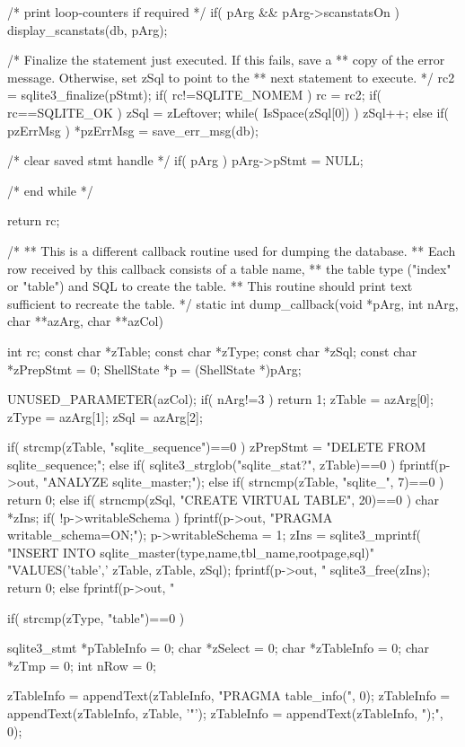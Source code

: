 \begin{Codex}[label=shell.c,numbers=left]
{{{{      /* print loop-counters if required */
      if( pArg && pArg->scanstatsOn ){
        display_scanstats(db, pArg);
      }

      /* Finalize the statement just executed. If this fails, save a 
      ** copy of the error message. Otherwise, set zSql to point to the
      ** next statement to execute. */
      rc2 = sqlite3_finalize(pStmt);
      if( rc!=SQLITE_NOMEM ) rc = rc2;
      if( rc==SQLITE_OK ){
        zSql = zLeftover;
        while( IsSpace(zSql[0]) ) zSql++;
      }else if( pzErrMsg ){
        *pzErrMsg = save_err_msg(db);
      }

      /* clear saved stmt handle */
      if( pArg ){
        pArg->pStmt = NULL;
      }
    }
  } /* end while */

  return rc;
}


/*
** This is a different callback routine used for dumping the database.
** Each row received by this callback consists of a table name,
** the table type ("index" or "table") and SQL to create the table.
** This routine should print text sufficient to recreate the table.
*/
static int dump_callback(void *pArg, int nArg, char **azArg, char **azCol){
  int rc;
  const char *zTable;
  const char *zType;
  const char *zSql;
  const char *zPrepStmt = 0;
  ShellState *p = (ShellState *)pArg;

  UNUSED_PARAMETER(azCol);
  if( nArg!=3 ) return 1;
  zTable = azArg[0];
  zType = azArg[1];
  zSql = azArg[2];
  
  if( strcmp(zTable, "sqlite_sequence")==0 ){
    zPrepStmt = "DELETE FROM sqlite_sequence;\n";
  }else if( sqlite3_strglob("sqlite_stat?", zTable)==0 ){
    fprintf(p->out, "ANALYZE sqlite_master;\n");
  }else if( strncmp(zTable, "sqlite_", 7)==0 ){
    return 0;
  }else if( strncmp(zSql, "CREATE VIRTUAL TABLE", 20)==0 ){
    char *zIns;
    if( !p->writableSchema ){
      fprintf(p->out, "PRAGMA writable_schema=ON;\n");
      p->writableSchema = 1;
    }
    zIns = sqlite3_mprintf(
       "INSERT INTO sqlite_master(type,name,tbl_name,rootpage,sql)"
       "VALUES('table','%
       zTable, zTable, zSql);
    fprintf(p->out, "%
    sqlite3_free(zIns);
    return 0;
  }else{
    fprintf(p->out, "%
  }

  if( strcmp(zType, "table")==0 ){
    sqlite3_stmt *pTableInfo = 0;
    char *zSelect = 0;
    char *zTableInfo = 0;
    char *zTmp = 0;
    int nRow = 0;
   
    zTableInfo = appendText(zTableInfo, "PRAGMA table_info(", 0);
    zTableInfo = appendText(zTableInfo, zTable, '"');
    zTableInfo = appendText(zTableInfo, ");", 0);

}}}
\end{Codex}
